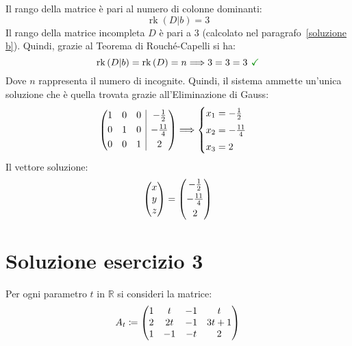\documentclass[a4paper]{article}
\makeatletter
\DeclareMathOperator{\rk}{rk}
\newenvironment{rowequmat}[1]{\left(\array{@{}#1@{}}}{\endarray\right)}
\makeatother
\begin{document}
	Il rango della matrice è pari al numero di colonne dominanti:
	\begin{equation*}
		\rk\left(D|b\right) = 3
	\end{equation*}
	Il rango della matrice incompleta $D$ è pari a $3$ (calcolato nel paragrafo~\ref{soluzione b}). Quindi, grazie al Teorema di Rouché-Capelli si ha:
	\begin{equation*}
		\rk\left(D|b\right) = \rk\left(D\right) = n \Longrightarrow 3 = 3 = 3 \textcolor{Green4}{\textbf{ \checkmark}}
	\end{equation*}
	Dove $n$ rappresenta il numero di incognite. Quindi, il sistema ammette un'unica soluzione che è quella trovata grazie all'Eliminazione di Gauss:
	\begin{equation*}
		\begin{rowequmat}{ccc|c}
			1 & 0 & 0 & -\frac{1}{2} \\ [0.3em]
			0 & 1 & 0 & -\frac{11}{4} \\ [0.3em]
			0 & 0 & 1 & 2
		\end{rowequmat} \Longrightarrow
		\begin{cases}
			x_{1} = -\frac{1}{2} \vspace{0.3em} \\
			x_{2} = -\frac{11}{4} \vspace{0.3em} \\
			x_{3} = 2
		\end{cases}
	\end{equation*}
	Il vettore soluzione:
	\begin{equation*}
		\begin{rowequmat}{c}
			x \\
			y \\
			z
		\end{rowequmat}
		= \begin{rowequmat}{c}
			-\frac{1}{2} \\ [0.3em]
			-\frac{11}{4} \\ [0.3em]
			2
		\end{rowequmat}
	\end{equation*}\newpage

	\section{Soluzione esercizio 3}
	
	Per ogni parametro $t$ in $\mathbb{R}$ si consideri la matrice:
	\begin{equation*}
		A_{t} \coloneq \begin{rowequmat}{cccc}
			1 & t & -1 & t \\
			2 & 2t & -1 & 3t+1 \\
			1 & -1 & -t & 2
		\end{rowequmat}
	\end{equation*}
	
\end{document}
